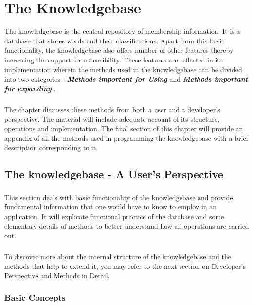 \chapter{The Knowledgebase}

The knowledgebase is the central repository of membership information. It is a database that stores words and their classifications. Apart from this basic functionality, the knowledgebase also offers number of other features thereby increasing the support for extensibility.
These features are reflected in its implementation wherein the methods used in the knowledgebase can be divided into two categories - \textbf{\emph{Methods important for Using \libalf}} and \textbf{\emph{Methods important for expanding \libalf}}. 
\paragraph{}
The chapter discusses these methods from both a user and a developer's perspective. The material will include adequate account of its structure, operations and implementation.  The final section of this chapter will provide an appendix of all the methods used in programming the knowledgebase with a brief description corresponding to it.  
\vskip 1pt

\section{The knowledgebase - A User's Perspective}

\paragraph{} This section deals with basic functionality of the knowledgebase and provide fundamental information that one would have to know to employ \libalf in an application. It will explicate functional practice of the database and some elementary details of methods to better understand how all operations are carried out. \paragraph{}
To discover more about the internal structure of the knowledgebase and the methods that help to extend it, you may refer to the next section on Developer's Perspective and Methods in Detail.

\subsection*{Basic Concepts}
	
